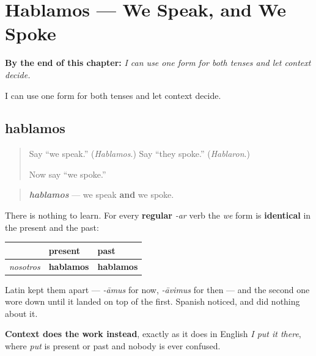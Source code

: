 
\chapter{Hablamos --- We Speak, and We Spoke}
\label{ch:hablamos-dos}

\begin{chapteropening}
\textbf{By the end of this chapter:} \emph{I can use one form for both tenses and let context decide.}

I can use one form for both tenses and let context decide.
\end{chapteropening}

\section[hablamos]{hablamos}

\label{lesson:ES-C55-hablamos-dos}



\begin{quote}
Say \textquotedblleft{}we speak.\textquotedblright{} (\emph{Hablamos}.) Say \textquotedblleft{}they spoke.\textquotedblright{} (\emph{Hablaron}.)

Now say \textquotedblleft{}we spoke.\textquotedblright{}
\end{quote}

\begin{grammarlens}[title={Grammar Lens: the form you already own}]
\begin{quote}
\emph{\textbf{hablamos}} — we speak \textbf{and} we spoke.
\end{quote}

There is nothing to learn. For every \textbf{regular} \emph{-ar} verb the \emph{we} form is \textbf{identical} in the present and the past:

\noindent
\begin{tabularx}{\linewidth}{@{}>{\raggedright\arraybackslash}X>{\raggedright\arraybackslash}X>{\raggedright\arraybackslash}X@{}}
\toprule
\textbf{} & \textbf{present} & \textbf{past} \\
\midrule
\emph{nosotros} & \textbf{hablamos} & \textbf{hablamos} \\
\bottomrule
\end{tabularx}

Latin kept them apart — \emph{-āmus} for now, \emph{-āvimus} for then — and the second one wore down until it landed on top of the first. Spanish noticed, and did nothing about it.

\textbf{Context does the work instead}, exactly as it does in English \emph{I put it there}, where \emph{put} is present or past and nobody is ever confused.
\end{grammarlens}

